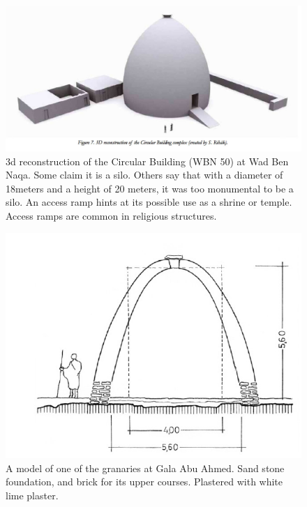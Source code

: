 \documentclass[a4paper,12pt]{scrreprt}
\begin{document}
\begin{figure}[H]
	\centering
	\includegraphics[width=\textwidth]{img/farmstead/3d_reconstruction}
	\caption{3d reconstruction of the Circular Building (WBN 50) at Wad Ben Naqa. Some claim it is a silo. Others say that with a diameter of 18meters and a height of 20 meters, it was too monumental to be a silo. An access ramp hints at its possible use as a shrine or temple. Access ramps are common in religious structures. }
\end{figure}

\begin{figure}[H]
	\centering
	\includegraphics[width=\textwidth]{img/farmstead/sketch_granaries_gala_abu_ahmed}
	\caption{A model of one of the granaries at Gala Abu Ahmed. Sand stone foundation, and brick for its upper courses. Plastered with white lime plaster.}
\end{figure}
\end{document}
